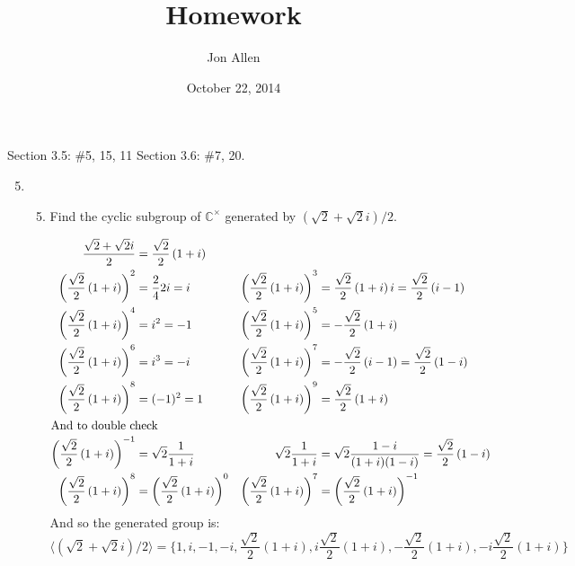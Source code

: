 \documentclass[letterpaper]{article}
\begin{document}
\title{Homework}
\date{October 22, 2014}
\author{Jon Allen}
\maketitle
Section 3.5: \#5, 15, 11
Section 3.6: \#7, 20.

\renewcommand{\labelenumi}{3.\arabic{enumi}}
\renewcommand{\labelenumii}{\arabic{enumii}.}
\renewcommand{\labelenumiii}{(\alph{enumiii})}
\begin{enumerate}
\setcounter{enumi}{4}
\item
  \begin{enumerate}
  \setcounter{enumii}{4}
  \item
    Find the cyclic subgroup of $\mathbb{C}^\times$ generated by $(\sqrt{2}+\sqrt{2}i)/2$.

    \begin{align*}
      \frac{\sqrt{2}+\sqrt{2}i}{2}&=\frac{\sqrt{2}}{2}\left(1+i\right)\\
      \left(\frac{\sqrt{2}}{2}\left(1+i\right)\right)^2&=\frac{2}{4}2i=i&
      \left(\frac{\sqrt{2}}{2}\left(1+i\right)\right)^3&=\frac{\sqrt{2}}{2}\left(1+i\right)i=\frac{\sqrt{2}}{2}\left(i-1\right)\\
      \left(\frac{\sqrt{2}}{2}\left(1+i\right)\right)^4&=i^2=-1&
      \left(\frac{\sqrt{2}}{2}\left(1+i\right)\right)^5&=-\frac{\sqrt{2}}{2}\left(1+i\right)\\
      \left(\frac{\sqrt{2}}{2}\left(1+i\right)\right)^6&=i^3=-i&
      \left(\frac{\sqrt{2}}{2}\left(1+i\right)\right)^7&=-\frac{\sqrt{2}}{2}\left(i-1\right)=\frac{\sqrt{2}}{2}\left(1-i\right)\\
      \left(\frac{\sqrt{2}}{2}\left(1+i\right)\right)^8&=(-1)^2=1&
      \left(\frac{\sqrt{2}}{2}\left(1+i\right)\right)^9&=\frac{\sqrt{2}}{2}\left(1+i\right)\\
      \intertext{And to double check}
      \left(\frac{\sqrt{2}}{2}\left(1+i\right)\right)^{-1}&=\sqrt{2}\frac{1}{1+i}&
      \sqrt{2}\frac{1}{1+i}&=\sqrt{2}\frac{1-i}{(1+i)(1-i)}=\frac{\sqrt{2}}{2}\left(1-i\right)\\
      \left(\frac{\sqrt{2}}{2}\left(1+i\right)\right)^8&=\left(\frac{\sqrt{2}}{2}\left(1+i\right)\right)^0&
      \left(\frac{\sqrt{2}}{2}\left(1+i\right)\right)^7&=\left(\frac{\sqrt{2}}{2}\left(1+i\right)\right)^{-1}
    \end{align*}
    And so the generated group is:
    \[
    \langle(\sqrt{2}+\sqrt{2}i)/2\rangle=\{1,i,-1,-i,\frac{\sqrt{2}}{2}(1+i),i\frac{\sqrt{2}}{2}(1+i),-\frac{\sqrt{2}}{2}(1+i),-i\frac{\sqrt{2}}{2}(1+i)\}
    \]


\end{enumerate}
\end{enumerate}
\end{document}
